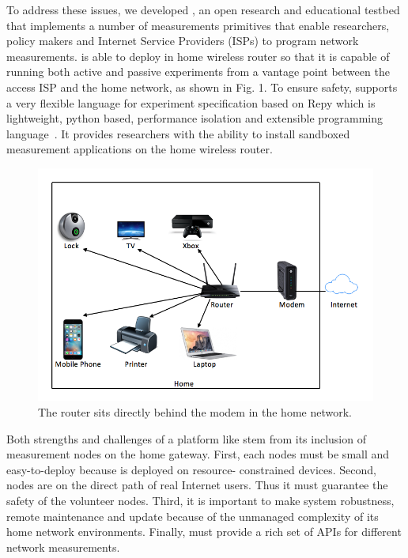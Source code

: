 To address these issues, we developed \sysname, an open research and educational testbed that implements a number of measurements primitives that enable researchers, policy makers and Internet Service Providers (ISPs) to program network measurements. \sysname is able to deploy in home wireless router so that it is capable of running both active and passive experiments from a vantage point between the access ISP and the home network, as shown in Fig. 1. To ensure safety, \sysname supports a very flexible language for experiment specification based on Repy which is lightweight, python based, performance isolation and extensible programming language~\cite{cappos2010retaining}. It provides researchers with the ability to install sandboxed measurement applications on the home wireless router. 

\begin{figure}%
\centering
\includegraphics[width=0.8\columnwidth]{figure/home-network.jpg}
\caption{The router sits directly behind the modem in the home network.}
\label{figure:design}
\end{figure}

Both strengths and challenges of a platform like \sysname stem from 
its inclusion of measurement nodes on the home gateway. First, each nodes 
must be small and easy-to-deploy because \sysname is deployed on resource-
constrained devices. Second, \sysname nodes are on the direct path of real 
Internet users. Thus it must guarantee the safety of the volunteer nodes. 
Third, it is important to make system robustness, remote maintenance and 
update because of the unmanaged complexity of its home network environments. 
Finally, \sysname must provide a rich set of APIs for different network 
measurements.

